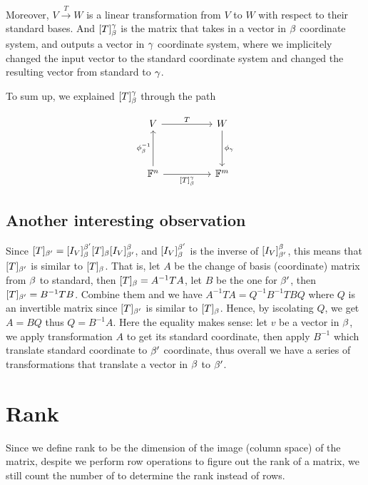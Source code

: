 \documentclass[11pt, cyan, night, 1in]{LatexTemplate/hw}
\begin{document}
Moreover, $V\stackrel{T}{\to} W$ is a linear transformation from $V$ to $W$ with respect to their standard bases. And $[T]_\beta^\gamma$ is the matrix that takes in a vector in $\beta$ coordinate system, and outputs a vector in $\gamma$ coordinate system, where we implicitely changed the input vector to the standard coordinate system and changed the resulting vector from standard to $\gamma$.

To sum up, we explained $[T]_\beta^\gamma$ through the path 

\[
    \begin{tikzcd}[row sep=huge, column sep=huge]
        V \arrow{r}{T}  & W \arrow{d}{\phi_\ga}\\
        \F^n \arrow{u}{\phi_\be^{-1}} \arrow[swap]{r}{[T]_\be^\ga} & \F^m
    \end{tikzcd}
\]

\subsection{Another interesting observation}

Since $[T]_{\beta'}=[I_V]_\beta^{\beta'}[T]_\beta[I_V]_{\beta'}^\beta$, and $[I_V]_\beta^{\beta'}$ is the inverse of $[I_V]_{\beta'}^\beta$, this means that $[T]_{\beta'}$ is similar to $[T]_\beta$. That is, let $A$ be the change of basis (coordinate) matrix from $\beta$ to standard, then $[T]_\beta=A^{-1}TA$, let $B$ be the one for $\beta'$, then $[T]_{\beta'}=B^{-1}TB$. Combine them and we have $A^{-1}TA=Q^{-1}B^{-1}TBQ$ where $Q$ is an invertible matrix since $[T]_{\beta'}$ is similar to $[T]_\beta$. Hence, by iscolating $Q$, we get $A=BQ$ thus $Q=B^{-1}A$. Here the equality makes sense: let $v$ be a vector in $\beta$, we apply transformation $A$ to get its standard coordinate, then apply $B^{-1}$ which translate standard coordinate to $\beta'$ coordinate, thus overall we have a series of transformations that translate a vector in $\beta$ to $\beta'$. 


\section{Rank}

Since we define rank to be the dimension of the image (column space) of the matrix, despite we perform row operations to figure out the rank of a matrix, we still count the number of  to determine the rank instead of rows.
\end{document}
